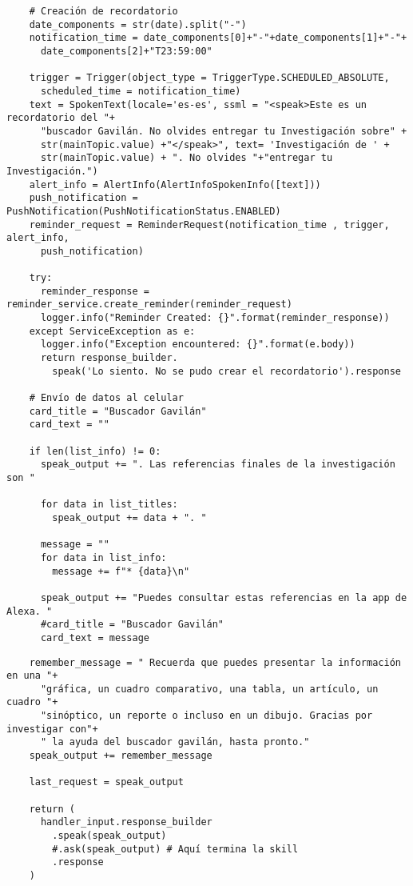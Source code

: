 \begin{tcolorbox}[colback=white!25!white,colframe=blue]
  \begin{verbatim}
    # Creación de recordatorio
    date_components = str(date).split("-")
    notification_time = date_components[0]+"-"+date_components[1]+"-"+
      date_components[2]+"T23:59:00"

    trigger = Trigger(object_type = TriggerType.SCHEDULED_ABSOLUTE, 
      scheduled_time = notification_time)
    text = SpokenText(locale='es-es', ssml = "<speak>Este es un recordatorio del "+
      "buscador Gavilán. No olvides entregar tu Investigación sobre" + 
      str(mainTopic.value) +"</speak>", text= 'Investigación de ' + 
      str(mainTopic.value) + ". No olvides "+"entregar tu Investigación.")
    alert_info = AlertInfo(AlertInfoSpokenInfo([text]))
    push_notification = PushNotification(PushNotificationStatus.ENABLED)
    reminder_request = ReminderRequest(notification_time , trigger, alert_info, 
      push_notification)

    try:
      reminder_response = reminder_service.create_reminder(reminder_request)
      logger.info("Reminder Created: {}".format(reminder_response))
    except ServiceException as e:
      logger.info("Exception encountered: {}".format(e.body))
      return response_builder.
        speak('Lo siento. No se pudo crear el recordatorio').response
        
    # Envío de datos al celular
    card_title = "Buscador Gavilán"
    card_text = ""
        
    if len(list_info) != 0:
      speak_output += ". Las referencias finales de la investigación son "
          
      for data in list_titles:
        speak_output += data + ". "
          
      message = ""
      for data in list_info:
        message += f"* {data}\n"
            
      speak_output += "Puedes consultar estas referencias en la app de Alexa. "
      #card_title = "Buscador Gavilán"
      card_text = message
  \end{verbatim}
\end{tcolorbox}

\begin{tcolorbox}[colback=white!25!white,colframe=blue]
  \begin{verbatim} 
    remember_message = " Recuerda que puedes presentar la información en una "+
      "gráfica, un cuadro comparativo, una tabla, un artículo, un cuadro "+
      "sinóptico, un reporte o incluso en un dibujo. Gracias por investigar con"+
      " la ayuda del buscador gavilán, hasta pronto."
    speak_output += remember_message
        
    last_request = speak_output
        
    return (
      handler_input.response_builder
        .speak(speak_output)
        #.ask(speak_output) # Aquí termina la skill
        .response
    )
  \end{verbatim}
\end{tcolorbox}


